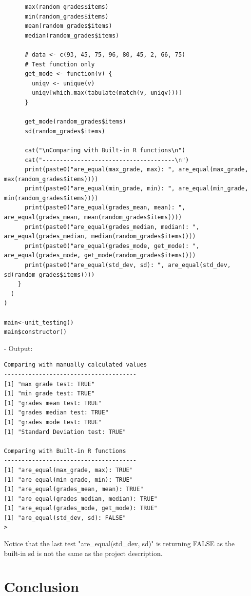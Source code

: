 \documentclass[11pt]{article}
\begin{document}
\begin{lstlisting}
      max(random_grades$items)
      min(random_grades$items)
      mean(random_grades$items)
      median(random_grades$items)
      
      # data <- c(93, 45, 75, 96, 80, 45, 2, 66, 75)
      # Test function only
      get_mode <- function(v) {
        uniqv <- unique(v)
        uniqv[which.max(tabulate(match(v, uniqv)))]
      }
      
      get_mode(random_grades$items)
      sd(random_grades$items)
      
      cat("\nComparing with Built-in R functions\n")
      cat("--------------------------------------\n")
      print(paste0("are_equal(max_grade, max): ", are_equal(max_grade, max(random_grades$items))))
      print(paste0("are_equal(min_grade, min): ", are_equal(min_grade, min(random_grades$items))))
      print(paste0("are_equal(grades_mean, mean): ", are_equal(grades_mean, mean(random_grades$items))))
      print(paste0("are_equal(grades_median, median): ", are_equal(grades_median, median(random_grades$items))))
      print(paste0("are_equal(grades_mode, get_mode): ", are_equal(grades_mode, get_mode(random_grades$items))))
      print(paste0("are_equal(std_dev, sd): ", are_equal(std_dev, sd(random_grades$items))))
    }
  )
)

main<-unit_testing()
main$constructor()
\end{lstlisting}

- Output:

\begin{lstlisting}
Comparing with manually calculated values
--------------------------------------
[1] "max grade test: TRUE"
[1] "min grade test: TRUE"
[1] "grades mean test: TRUE"
[1] "grades median test: TRUE"
[1] "grades mode test: TRUE"
[1] "Standard Deviation test: TRUE"

Comparing with Built-in R functions
--------------------------------------
[1] "are_equal(max_grade, max): TRUE"
[1] "are_equal(min_grade, min): TRUE"
[1] "are_equal(grades_mean, mean): TRUE"
[1] "are_equal(grades_median, median): TRUE"
[1] "are_equal(grades_mode, get_mode): TRUE"
[1] "are_equal(std_dev, sd): FALSE"
> 
\end{lstlisting}

Notice that the last test "are\_equal(std\_dev, sd)" is returning FALSE as the built-in \gls{sd} is not the same as the project description.
\newpage

\section{Conclusion}
\end{document}
